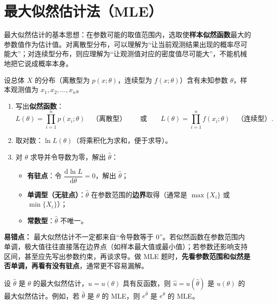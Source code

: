 ﻿\documentclass[lang=cn,11pt]{elegantbook}
\begin{document}
\section{最大似然估计法（MLE）} \label{subsec:mle}

最大似然估计的基本思想：在参数可能的取值范围内，选取使\textbf{样本似然函数}最大的参数值作为估计值。对离散型分布，可以理解为“让当前观测结果出现的概率尽可能大”；对连续型分布，则应理解为“让观测值对应的密度值尽可能大”，不能机械地把它说成概率本身。

\begin{property}[最大似然估计的步骤] \label{prop:mle-steps}
设总体 \(X\) 的分布（离散型为 \(p(x;\theta)\)，连续型为 \(f(x;\theta)\)）含有未知参数 \(\theta\)，样本观测值为 \(x_1, x_2, \dots, x_n\)。
\begin{enumerate}
    \item 写出\textbf{似然函数}：
    \[
    L(\theta) = \prod_{i=1}^{n}p(x_i;\theta)\quad\text{（离散型）}\qquad\text{或}\qquad L(\theta) = \prod_{i=1}^{n}f(x_i;\theta)\quad\text{（连续型）}.
    \]
    \item 取对数：\(\ln L(\theta)\)（将乘积化为求和，便于求导）。
    \item 对 \(\theta\) 求导并令导数为零，解出 \(\hat{\theta}\)：
    \begin{itemize}
        \item \textbf{有驻点}：令 \(\dfrac{\mathrm{d}\ln L}{\mathrm{d}\theta} = 0\)，解出 \(\hat{\theta}\)；
        \item \textbf{单调型（无驻点）}：\(\hat{\theta}\) 在参数范围的\textbf{边界}取得（通常是 \(\max\{X_i\}\) 或 \(\min\{X_i\}\)）；
        \item \textbf{常数型}：\(\hat{\theta}\) 不唯一。
    \end{itemize}
\end{enumerate}
\end{property}

\begin{note}
\textbf{易错点：} 最大似然估计不一定都来自“令导数等于 0”。若似然函数在参数范围内单调，极大值往往直接落在边界点（如样本最大值或最小值）；若参数还影响支持区间，甚至应先写出参数约束，再谈求导。做 MLE 题时，\textbf{先看参数范围和似然是否单调，再看有没有驻点}，通常更不容易漏解。
\end{note}



\begin{property}[最大似然估计的不变性] \label{prop:mle-inv}
设 \(\hat{\theta}\) 是 \(\theta\) 的最大似然估计，\(u = u(\theta)\) 具有反函数，则 \(\hat{u} = u(\hat{\theta})\) 是 \(u(\theta)\) 的最大似然估计。例如，若 \(\hat{\theta}\) 是 \(\theta\) 的 MLE，则 \(e^{\hat{\theta}}\) 是 \(e^\theta\) 的 MLE。
\end{property}
\end{document}
